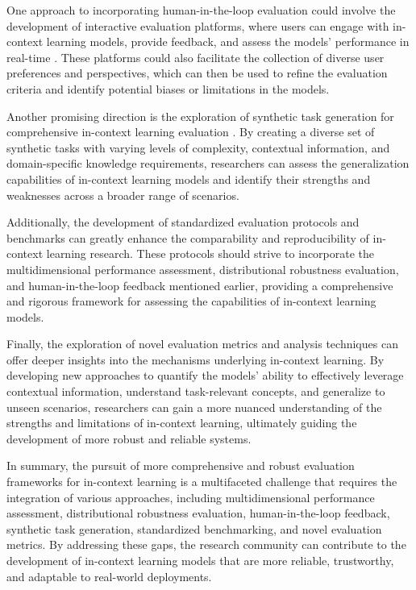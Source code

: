 \documentclass[11pt]{article}
\begin{document}
One approach to incorporating human-in-the-loop evaluation could involve the development of interactive evaluation platforms, where users can engage with in-context learning models, provide feedback, and assess the models' performance in real-time \cite{ref315}. These platforms could also facilitate the collection of diverse user preferences and perspectives, which can then be used to refine the evaluation criteria and identify potential biases or limitations in the models.

Another promising direction is the exploration of synthetic task generation for comprehensive in-context learning evaluation \cite{ref24}. By creating a diverse set of synthetic tasks with varying levels of complexity, contextual information, and domain-specific knowledge requirements, researchers can assess the generalization capabilities of in-context learning models and identify their strengths and weaknesses across a broader range of scenarios.

Additionally, the development of standardized evaluation protocols and benchmarks \cite{ref316,ref24} can greatly enhance the comparability and reproducibility of in-context learning research. These protocols should strive to incorporate the multidimensional performance assessment, distributional robustness evaluation, and human-in-the-loop feedback mentioned earlier, providing a comprehensive and rigorous framework for assessing the capabilities of in-context learning models.

Finally, the exploration of novel evaluation metrics and analysis techniques \cite{ref46} can offer deeper insights into the mechanisms underlying in-context learning. By developing new approaches to quantify the models' ability to effectively leverage contextual information, understand task-relevant concepts, and generalize to unseen scenarios, researchers can gain a more nuanced understanding of the strengths and limitations of in-context learning, ultimately guiding the development of more robust and reliable systems.

In summary, the pursuit of more comprehensive and robust evaluation frameworks for in-context learning is a multifaceted challenge that requires the integration of various approaches, including multidimensional performance assessment, distributional robustness evaluation, human-in-the-loop feedback, synthetic task generation, standardized benchmarking, and novel evaluation metrics. By addressing these gaps, the research community can contribute to the development of in-context learning models that are more reliable, trustworthy, and adaptable to real-world deployments.
\end{document}
